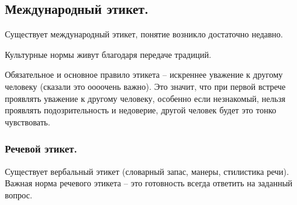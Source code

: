 \subsection{Международный этикет.}

Существует международный этикет, понятие возникло достаточно недавно.

Культурные нормы живут благодаря передаче традиций.

Обязательное и основное правило этикета – искреннее уважение к другому человеку (сказали это оооочень важно). Это значит, что при первой встрече проявлять уважение к другому человеку, особенно если незнакомый, нельзя проявлять подозрительность и недоверие, другой человек будет это тонко чувствовать.

\subsubsection{Речевой этикет.}

Существует вербальный этикет (словарный запас, манеры, стилистика речи). Важная норма речевого этикета – это готовность всегда ответить на заданный вопрос. 

